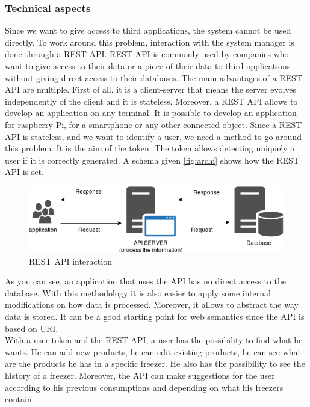 \subsubsection{Technical aspects}
Since we want to give access to third applications, the system cannot be used directly. To work around this problem, interaction with the system manager is done through a REST API. REST API is commonly used by companies who want to give access to their data or a piece of their data to third applications without giving direct access to their databases. The main advantages of a REST API are multiple. First of all, it is a client-server that means the server evolves independently of the client and it is stateless. Moreover, a REST API allows to develop an application on any terminal. It is possible to develop an application for raspberry Pi, for a smartphone or any other connected object. Since a REST API is stateless, and we want to identify a user, we need a method to go around this problem. It is the aim of the token. The token allows detecting uniquely a user if it is correctly generated. A schema given \autoref{fig:archi} shows how the REST API is set. \\
\begin{figure}[H]
\centering
\includegraphics[scale=0.5]{./images/archi.png}
\caption{REST API interaction}
\label{fig:archi}
\end{figure}

As you can see, an application that uses the API has no direct access to the database. With this methodology it is also easier to apply some internal modifications on how data is processed. Moreover, it allows to abstract the way data is stored. It can be a good starting point for web semantics since the API is based on URI.\\

With a user token and the REST API, a user has the possibility to find what he wants. He can add new products, he can edit existing products, he can see what are the products he has in a specific freezer. He also has the possibility to see the history of a freezer. Moreover, the API can make suggestions for the user according to his previous consumptions and depending on what his freezers contain.\\

